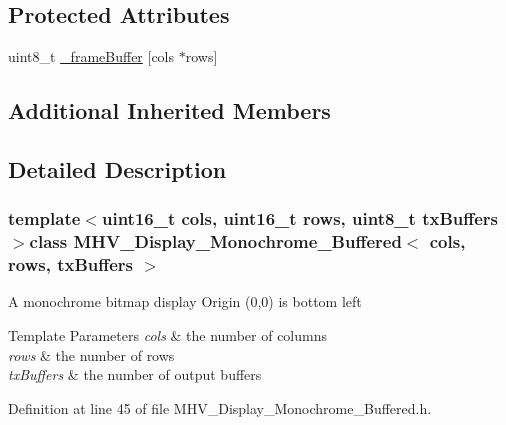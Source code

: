 \subsection*{Protected Attributes}
\begin{DoxyCompactItemize}
\item 
uint8\-\_\-t \hyperlink{class_m_h_v___display___monochrome___buffered_a8cca00a948839269e89b4ede9d314ad8}{\-\_\-frame\-Buffer} \mbox{[}cols $\ast$rows\mbox{]}
\end{DoxyCompactItemize}
\subsection*{Additional Inherited Members}


\subsection{Detailed Description}
\subsubsection*{template$<$uint16\-\_\-t cols, uint16\-\_\-t rows, uint8\-\_\-t tx\-Buffers$>$class M\-H\-V\-\_\-\-Display\-\_\-\-Monochrome\-\_\-\-Buffered$<$ cols, rows, tx\-Buffers $>$}

A monochrome bitmap display Origin (0,0) is bottom left 
\begin{DoxyTemplParams}{Template Parameters}
{\em cols} & the number of columns \\
\hline
{\em rows} & the number of rows \\
\hline
{\em tx\-Buffers} & the number of output buffers \\
\hline
\end{DoxyTemplParams}


Definition at line 45 of file M\-H\-V\-\_\-\-Display\-\_\-\-Monochrome\-\_\-\-Buffered.\-h.



